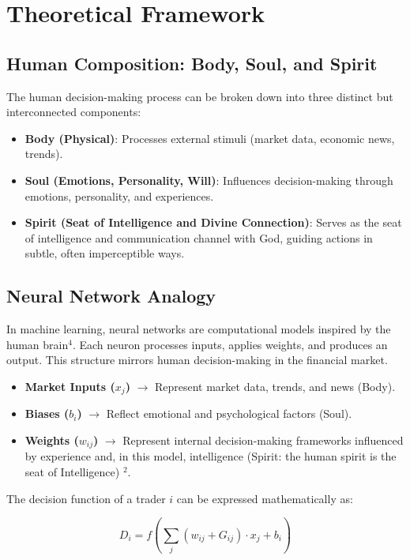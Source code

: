 \documentclass{article}
\begin{document}
\section{Theoretical Framework}

\subsection{Human Composition: Body, Soul, and Spirit}

The human decision-making process can be broken down into three distinct but interconnected components:

\begin{itemize}
\item {\bf Body (Physical)}: Processes external stimuli (market data, economic news, trends).  
\item {\bf Soul (Emotions, Personality, Will)}: Influences decision-making through emotions, personality, and experiences.  
\item {\bf Spirit (Seat of Intelligence and Divine Connection)}: Serves as the seat of intelligence and communication channel with God, guiding actions in subtle, often imperceptible ways.
\end{itemize}

\subsection{Neural Network Analogy}

In machine learning, neural networks are computational models inspired by the human brain$^4$. Each neuron processes inputs, applies weights, and produces an output. This structure mirrors human decision-making in the financial market.

\begin{itemize}
\item {\bf Market Inputs ($x_j$)} $\to$ Represent market data, trends, and news (Body).  
\item  {\bf Biases ($b_i$)} $\to$ Reflect emotional and psychological factors (Soul).  
\item {\bf Weights ($w_{ij}$)} $\to$  Represent internal decision-making frameworks influenced by experience and, in this model, intelligence (Spirit: the human spirit is the seat of Intelligence) $^2$.
\end{itemize}


The decision function of a trader \(i\) can be expressed mathematically as:

$$
D_i = f\left(\sum_{j} (w_{ij} + G_{ij}) \cdot x_j + b_i\right)
$$
\end{document}

